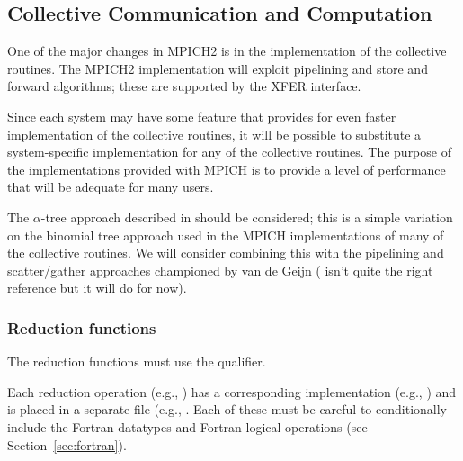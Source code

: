 \subsection{Collective Communication and Computation}
\label{sec:collective-comm}

One of the major changes in MPICH2 is in the implementation of the
collective routines.  The MPICH2 implementation will exploit
pipelining and store and forward algorithms; these are supported by
the XFER interface. 

Since each system may have some feature that provides for even faster
implementation of the collective routines, it will be possible to
substitute a system-specific implementation for any of the collective
routines.  The purpose of the implementations provided with MPICH is
to provide a level of performance that will be adequate
for many users.  

The $\alpha$-tree approach described in
\cite{bern:mpi-collective:hpcn99} should be considered; this is a
simple variation on the binomial tree approach used in the MPICH
implementations of many of the collective routines.  We will consider
combining this with the pipelining and scatter/gather approaches
championed by van de Geijn (\cite{vandegeijn} isn't quite the right
reference but it will do for now).

\subsubsection{Reduction functions}
The reduction functions must use the  qualifier.

Each reduction operation (e.g., ) has a corresponding
implementation (e.g., ) and is placed in a separate file (e.g.,
.  Each of these must be careful to conditionally include the
Fortran datatypes and Fortran logical operations (see
Section~\ref{sec:fortran}).

